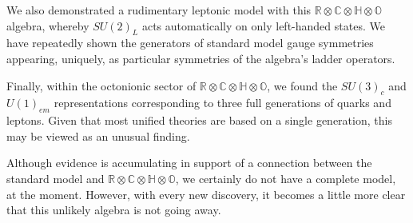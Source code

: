 \documentclass[letterpaper,12pt,titlepage,oneside,final]{book}
\newcommand{\RCHO}{\mathbb{R}\otimes\mathbb{C}\otimes\mathbb{H}\otimes\mathbb{O}}
\begin{document}
We also  demonstrated a rudimentary leptonic model with this $\RCHO$ algebra, whereby $SU(2)_L$ acts automatically on only left-handed states.  We have repeatedly shown the generators of standard model gauge symmetries appearing, uniquely, as particular symmetries of the algebra's ladder operators.  

Finally, within the octonionic sector of $\RCHO$, we found the  $SU(3)_c$ and $U(1)_{em}$ representations corresponding to three full generations of quarks and leptons.  Given that most unified theories are based on a single generation, this may be viewed as an unusual finding.

Although evidence is accumulating in support of a connection between the standard model and $\RCHO$, we certainly do not have a complete model, at the moment.  However, with every new discovery, it becomes a little more clear that this unlikely algebra is not going away.
















\end{document}
